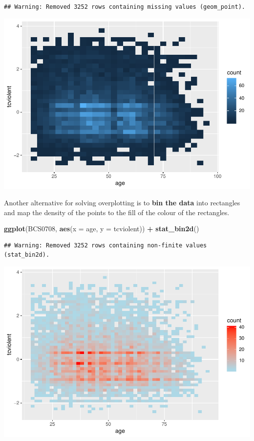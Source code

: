 \documentclass[]{book}
\newenvironment{Shaded}{\begin{snugshade}}{\end{snugshade}}
\newcommand{\DataTypeTok}[1]{\textcolor[rgb]{0.13,0.29,0.53}{#1}}
\newcommand{\KeywordTok}[1]{\textcolor[rgb]{0.13,0.29,0.53}{\textbf{#1}}}
\newcommand{\NormalTok}[1]{#1}
\newcommand{\OperatorTok}[1]{\textcolor[rgb]{0.81,0.36,0.00}{\textbf{#1}}}
\newcommand{\StringTok}[1]{\textcolor[rgb]{0.31,0.60,0.02}{#1}}
\theoremstyle{definition}
\theoremstyle{definition}
\theoremstyle{definition}
\theoremstyle{remark}
\begin{document}
\begin{verbatim}
## Warning: Removed 3252 rows containing missing values (geom_point).
\end{verbatim}

\includegraphics{03-visualisation_files/figure-latex/unnamed-chunk-39-1.pdf}

Another alternative for solving overplotting is to \textbf{bin the data}
into rectangles and map the density of the points to the fill of the
colour of the rectangles.

\begin{Shaded}
\begin{Highlighting}[]
\KeywordTok{ggplot}\NormalTok{(BCS0708, }\KeywordTok{aes}\NormalTok{(}\DataTypeTok{x =}\NormalTok{ age, }\DataTypeTok{y =}\NormalTok{ tcviolent)) }\OperatorTok{+}
\StringTok{  }\KeywordTok{stat_bin2d}\NormalTok{()}
\end{Highlighting}
\end{Shaded}

\begin{verbatim}
## Warning: Removed 3252 rows containing non-finite values (stat_bin2d).
\end{verbatim}

\includegraphics{03-visualisation_files/figure-latex/unnamed-chunk-40-1.pdf}
\end{document}
